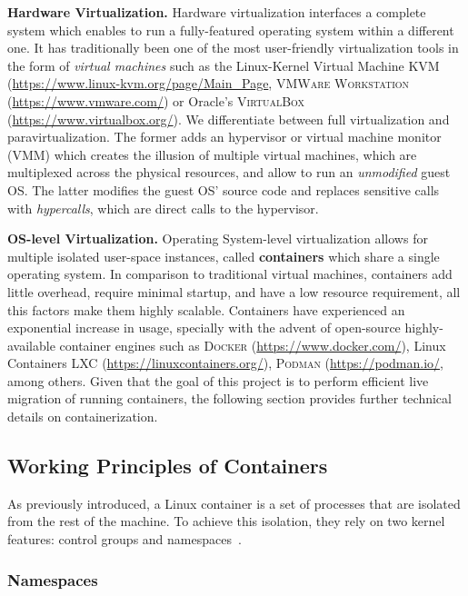 \textbf{Hardware Virtualization.}
Hardware virtualization interfaces a complete system which enables to run a fully-featured operating system within a different one.
It has traditionally been one of the most user-friendly virtualization tools in the form of \emph{virtual machines} such as the Linux-Kernel Virtual Machine \textsc{KVM} (\url{https://www.linux-kvm.org/page/Main_Page}, \textsc{VMWare Workstation} (\url{https://www.vmware.com/}) or Oracle's \textsc{VirtualBox} (\url{https://www.virtualbox.org/}).
We differentiate between full virtualization and paravirtualization.
The former adds an hypervisor or virtual machine monitor (VMM) which creates the illusion of multiple virtual machines, which are multiplexed across the physical resources, and allow to run an \emph{unmodified} guest OS.
The latter modifies the guest OS' source code and replaces sensitive calls with \emph{hypercalls}, which are direct calls to the hypervisor.

\textbf{OS-level Virtualization.}
Operating System-level virtualization allows for multiple isolated user-space instances, called \textbf{containers} which share a single operating system.
In comparison to traditional virtual machines, containers add little overhead, require minimal startup, and have a low resource requirement, all this factors make them highly scalable.
Containers have experienced an exponential increase in usage, specially with the advent of open-source highly-available container engines such as \textsc{Docker} (\url{https://www.docker.com/}), Linux Containers \textsc{LXC} (\url{https://linuxcontainers.org/}), \textsc{Podman} (\url{https://podman.io/}, among others.
Given that the goal of this project is to perform efficient live migration of running containers, the following section provides further technical details on containerization.

\subsection{Working Principles of Containers}

As previously introduced, a Linux container is a set of processes that are isolated from the rest of the machine.
To achieve this isolation, they rely on two kernel features: control groups and namespaces~\cite{namespaces-manual}.

\subsubsection*{Namespaces}

